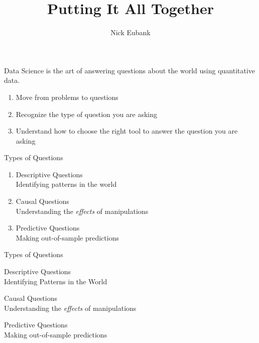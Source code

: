 \documentclass[11pt]{beamer}
\title{Putting It All Together}
\author{\small Nick Eubank}
\date{\vspace*{.3in} \date}
\begin{document}
\begin{frame}[c]
\maketitle
\end{frame}

\begin{frame}[c]{}
  \pause Data Science is the art of \alert{answering questions} about the world using \alert{quantitative data.} 
\end{frame}

\begin{frame}[c]{}
 \begin{enumerate}
   \pause \item Move from \alert{problems to questions}
   \pause \item Recognize the \alert{type} of question you are asking 
   \pause \item Understand how to choose the \alert{right tool} to answer the question you are asking
 \end{enumerate}
\end{frame}

\begin{frame}[c]{Types of Questions}
  \begin{enumerate}
    \pause \item Descriptive Questions \\
    {\color{gray} Identifying patterns in the world}
    \pause \item Causal Questions \\
    {\color{gray} Understanding the \emph{effects} of manipulations}
    \pause \item Predictive Questions \\
    {\color{gray} Making out-of-sample predictions}
  \end{enumerate}
\end{frame}


\begin{frame}[c]{Types of Questions}
  \begin{enumerate}
    \item \alert{Descriptive Questions} \\
    {\color{gray} Identifying Patterns in the World}
    {\color{gray} \item Causal Questions \\
    {\color{gray} Understanding the \emph{effects} of manipulations}
    \item Predictive Questions \\
    {\color{gray} Making out-of-sample predictions} }
  \end{enumerate}
\end{frame}
\end{document}
